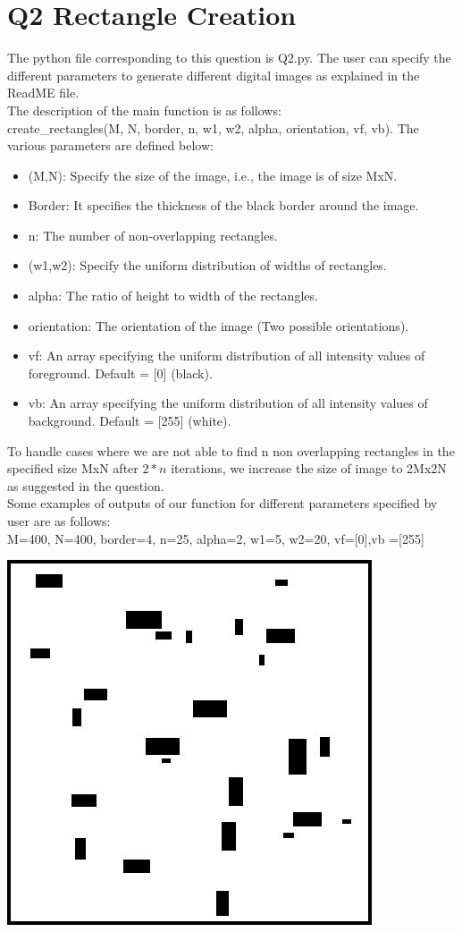 \documentclass[12pt]{article}
\begin{document}
\section{Q2 Rectangle Creation}
The python file corresponding to this question is Q2.py. The user can specify the different parameters to generate different digital images as explained in the ReadME file. \\
The description of the main function is as follows:\\
create\_rectangles(M, N, border, n, w1, w2, alpha, orientation, vf, vb).
The various parameters are defined below:
\begin{itemize}
    \item (M,N): Specify the size of the image, i.e., the image is of size MxN.
    \item Border: It specifies the thickness of the black border around the image.
    \item n: The number of non-overlapping rectangles.
    \item (w1,w2): Specify the uniform distribution of widths of rectangles. 
    \item alpha: The ratio of height to width of the rectangles.
    \item orientation: The orientation of the image (Two possible orientations).
    \item vf: An array specifying the uniform distribution of all intensity values of foreground. Default = [0] (black).
    \item vb: An array specifying the uniform distribution of all intensity values of background. Default = [255] (white).
\end{itemize}
To handle cases where we are not able to find n non overlapping rectangles in the specified size MxN after $2*n$ iterations, we increase the size of image to 2Mx2N as suggested in the question.\\
Some examples of outputs of our function for different parameters specified by user are as follows:\\
M=400, N=400, border=4, n=25, alpha=2, w1=5, w2=20, vf=[0],vb =[255]\\
\begin{center}
\includegraphics[scale=0.5]{rectangle1.jpg}
\end{center}
\end{document}
